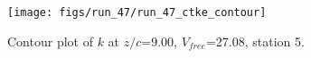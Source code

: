 \begin{figure}[H]
\centering
\texttt{[image: figs/run\_47/run\_47\_ctke\_contour]}
\caption{Contour plot of $k$ at $z/c$=9.00, $V_{free}$=27.08, station 5.}
\end{figure}


